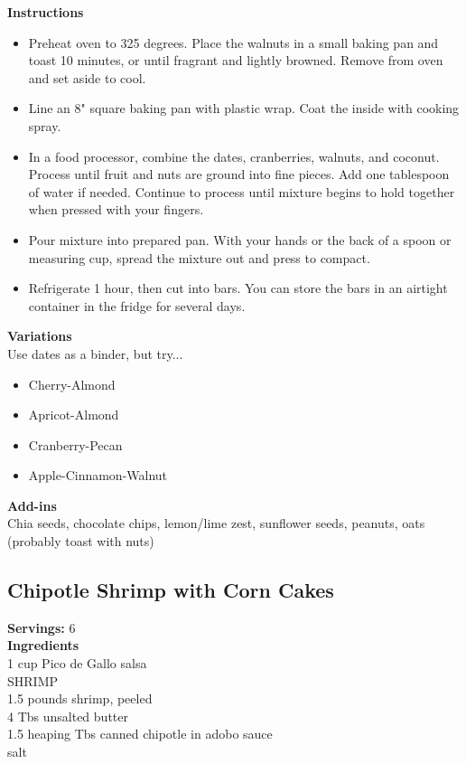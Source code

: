 \documentclass{article}
\numberwithin{figure}{section}
\numberwithin{equation}{section}
\begin{document}
{\bf Instructions}
\begin{itemize}
\item Preheat oven to 325 degrees. Place the walnuts in a small baking pan and toast 10 minutes, or until fragrant and lightly browned. Remove from oven and set aside to cool. 
\item Line an 8" square baking pan with plastic wrap. Coat the inside with cooking spray. 
\item In a food processor, combine the dates, cranberries, walnuts, and coconut. Process until fruit and nuts are ground into fine pieces. Add one tablespoon of water if needed. Continue to process until mixture begins to hold together when pressed with your fingers. 
\item Pour mixture into prepared pan. With your hands or the back of a spoon or measuring cup, spread the mixture out and press to compact. 
\item Refrigerate 1 hour, then cut into bars. You can store the bars in an airtight container in the fridge for several days.
\end{itemize}

{\bf Variations}\\
Use dates as a binder, but try...
\begin{itemize}
\item Cherry-Almond
\item Apricot-Almond
\item Cranberry-Pecan
\item Apple-Cinnamon-Walnut
\end{itemize}

{\bf Add-ins}\\
Chia seeds, chocolate chips, lemon/lime zest, sunflower seeds, peanuts, oats (probably toast with nuts)


\pagebreak
\subsection{Chipotle Shrimp with Corn Cakes}
{\bf Servings:} 6\\

{\bf Ingredients}\\
1 cup Pico de Gallo salsa\\

SHRIMP\\
1.5 pounds shrimp, peeled\\
4 Tbs unsalted butter\\
1.5 heaping Tbs canned chipotle in adobo sauce\\
salt\\
\end{document}

